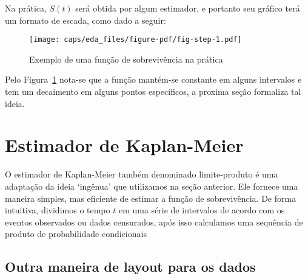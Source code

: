 \documentclass[
  letterpaper,
  DIV=11,
  numbers=noendperiod]{scrreprt}
\begin{document}
Na prática, \(S(t)\) será obtida por algum estimador, e portanto seu
gráfico terá um formato de escada, como dado a seguir:

\begin{figure}

{\centering \texttt{[image: caps/eda\_files/figure-pdf/fig-step-1.pdf]}

}

\caption{\label{fig-step}Exemplo de uma função de sobrevivência na
prática}

\end{figure}

Pelo Figura~\ref{fig-step} nota-se que a função mantém-se constante em
alguns intervalos e tem um decaimento em alguns pontos específicos, a
proxima seção formaliza tal ideia.

\hypertarget{estimador-de-kaplan-meier}{%
\chapter{Estimador de Kaplan-Meier}\label{estimador-de-kaplan-meier}}

O estimador de Kaplan-Meier também denominado limite-produto é uma
adaptação da ideia `ingênua' que utilizamos na seção anterior. Ele
fornece uma maneira simples, mas eficiente de estimar a função de
sobrevivência. De forma intuitiva, dividimos o tempo \(t\) em uma série
de intervalos de acordo com os eventos observados ou dados censurados,
após isso calculamos uma sequência de produto de probabilidade
condicionais

\hypertarget{outra-maneira-de-layout-para-os-dados}{%
\section{Outra maneira de layout para os
dados}\label{outra-maneira-de-layout-para-os-dados}}
\end{document}

